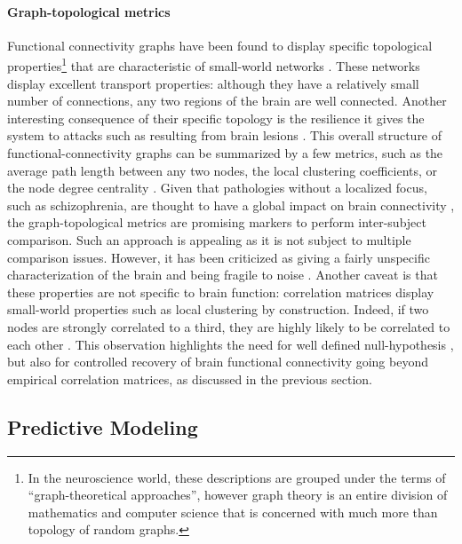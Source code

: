 \documentclass[5p]{elsarticle}
\begin{document}
\paragraph{Graph-topological metrics}
%
Functional connectivity graphs have been found to display specific
topological properties\footnote{In the neuroscience world, these
descriptions are grouped under the terms of ``graph-theoretical
approaches'', however graph theory is an entire division of mathematics
and computer science that is concerned with much more than topology of
random graphs.} that are characteristic of small-world networks
\cite{stam2004,salvador2005,achard2006,bullmore2009}. These networks
display excellent transport properties: although they have a relatively
small number of connections, any two regions of the brain are well
connected. 
Another interesting consequence of their specific topology is
the resilience it gives the system to attacks such as resulting from
brain lesions \cite{achard2006}. This overall structure of
functional-connectivity graphs can be summarized by a few metrics, such
as the average path length between any two nodes, the local clustering
coefficients, or the node degree centrality \cite{rubinov2010}. Given that pathologies without a
localized focus, such
as schizophrenia, are thought to have a global impact on brain
connectivity \cite{liu2008,bassett2008}, the graph-topological metrics are
promising markers to perform inter-subject comparison. Such an
approach is appealing as it is not subject to multiple comparison issues.
However, it has been criticized as giving a fairly unspecific
characterization of the brain and being fragile to noise
\cite{ioannides2007}. Another caveat is that these properties are not
specific to brain function: correlation matrices display
small-world properties such as local clustering by construction. Indeed, if two
nodes are strongly correlated to a third, they are highly likely to be
correlated to each other \cite{zalesky2012}. This observation highlights
the need for well defined null-hypothesis \cite{zalesky2012,rubinov2011},
but also for controlled recovery of brain functional connectivity going
beyond empirical correlation matrices, as discussed in the previous section.


\subsection{Predictive Modeling}
\end{document}
